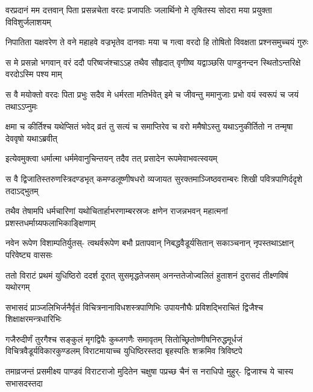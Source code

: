


\fourlineindentedshloka
{वरप्रदानं मम दत्तवान् पिता}
{प्रसन्नचेता वरदः प्रजापतिः}
{जलार्थिनो मे तृषितस्य सोदरा}
{मया प्रयुक्ता विविशुर्जलाशयम्}


\fourlineindentedshloka
{निपातिता यक्षवरेण ते वने}
{महाहवे वज्रभृतेव दानवाः}
{मया च गत्वा वरदो हि तोषितो}
{विवक्षता प्रश्नसमुच्चयं गुरुः}


\fourlineindentedshloka
{स मे प्रसन्नो भगवान् वरं ददौ}
{परिष्वजंश्चाऽऽह तथैव सौहृदात्}
{वृणीष्व यद्वाञ्छसि पाण्डुनन्दन}
{स्थितोऽन्तरिक्षे वरदोऽस्मि पश्य माम्}


\fourlineindentedshloka
{स वै मयोक्तो वरदः पिता प्रभुः}
{सदैव मे धर्मरता मतिर्भवेत्}
{इमे च जीवन्तु ममानुजाः प्रभो}
{वयं स्वरूपं च जयं तथाऽऽप्नुमः}


\fourlineindentedshloka
{क्षमा च कीर्तिश्च यथेप्सितं भवेद्}
{व्रतं तु सत्यं च समाप्तिरेव च}
{वरो ममैषोऽस्तु यथाऽनुकीर्तितो}
{न तन्मृषा देववृषो यथाऽब्रवीत्}



\twolineshloka
{इत्येवमुक्त्वा धर्मात्मा धर्ममेवानुचिन्तयन्}
{तदैव तत् प्रसादेन रूपमेवाभवत्स्वयम्}


\fourlineindentedshloka
{स वै द्विजातिस्तरुणस्त्रिदण्डभृत्}
{कमण्डलूष्णीषधरो व्यजायत}
{सुरक्तमाञ्जिष्ठवराम्बरः शिखी}
{पवित्रपाणिर्ददृशे तदाऽद्भुतम्}


\fourlineindentedshloka
{तथैव तेषामपि धर्मचारिणां}
{यथोचितार्हाभरणाम्बरस्रजः}
{क्षणेन राजन्नभवन् महात्मनां}
{प्रशस्तधर्माग्र्यफलाभिकाङ्क्षिणाम्}


\fourlineindentedshloka
{नवेन रूपेण विशाम्पतिर्युतस्-}
{त्वथर्वरूपेण बभौ प्रतापवान्}
{निबद्धवैडूर्यसितान् सकाञ्चनान्}
{नृपस्तथाऽक्षान् परिवेष्ट्य वाससः}


\fourlineindentedshloka
{ततो विराटं प्रथमं युधिष्ठिरो}
{ददर्श दूरात् सुसमृद्धतेजसम्}
{अनन्ततेजोज्वलितं हुताशनं}
{दुरासदं तीक्ष्णविषं यथोरगम्}


\fourlineindentedshloka
{सभासदं प्राञ्जलिभिर्जनैर्वृतं}
{विचित्रनानाविधशस्त्रपाणिभिः}
{उपायनौघैः प्रविशद्भिराचितं}
{द्विजैश्च शिक्षाक्षरमन्त्रधारिभिः}



\sixlineindentedshloka
{गजैरुदीर्णं तुरगैश्च सङ्कुलं}
{मृगद्विपैः कुब्जगणैः समावृतम्}
{सितोच्छ्रितोष्णीषनिरुद्धमूर्धजं}
{विचित्रवैडूर्यविकारकुण्डलम्}
{विराटमायाच्च युधिष्ठिरस्तदा}
{बृहस्पतिः शक्रमिव त्रिविष्टपे}


\fourlineindentedshloka
{तमाव्रजन्तं प्रसमीक्ष्य पाण्डवं}
{विराटराजो मुदितेन चक्षुषा}
{पप्रच्छ चैनं स नराधिपो मुहुर्-}
{द्विजाश्च ये चास्य सभासदस्तदा}

